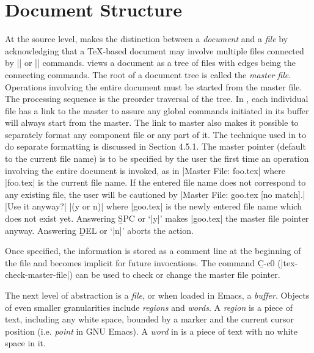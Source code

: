 \section{Document Structure}


\noindent 
At the source level, {\TM} makes the distinction between a {\it document\/} 
and a {\it file\/} by acknowledging that a {\TeX}-based document may involve 
multiple files connected by || or || commands.  {\TM} views a
document as a tree of files with edges being the connecting commands.
The root of a document tree is called the {\it master file\/}.
Operations involving the entire document must be started from the
master file.  The processing sequence is the preorder traversal of the tree.
In {\TM}, each individual file has a link to the master 
to assure any global commands initiated in its buffer will
always start from the master.  The link to master also makes it possible
to separately format any component file or any part of it.  The technique
used in {\TM} to do separate formatting is discussed in Section 4.5.1.
The master pointer (default to the current file name) is to be specified by
the user the first time an operation involving the entire document is invoked,
as in
\begindisplay
|Master File: foo.tex|\cr
\enddisplay
where |foo.tex| is the current file name.
If the entered file name does not correspond to any existing file,
the user will be cautioned by
\begindisplay
|Master File: goo.tex [no match].|  |Use it anyway?| |(y or n)|\cr
\enddisplay
where |goo.tex| is the newly entered file name which does not exist yet.
Answering {\b SPC} or `|y|' makes |goo.tex| the master file pointer anyway.
Answering {\b DEL} or `|n|' aborts the action.

Once specified, the information is stored as a comment line
at the beginning of the file and becomes implicit for future invocations.
The command {\b C-c{\s}0} (|tex-check-master-file|) can be used
to check or change the master file pointer.

The next level of abstraction is a {\it file\/}, or when loaded in Emacs, 
a {\it buffer\/}.
Objects of even smaller granularities include {\it regions\/} and 
{\it words\/}.  A {\it region\/} is a piece of text, including
any white space, bounded by a marker and the current cursor position
(i.e. {\it point\/} in GNU Emacs).  A {\it word\/} in {\TM} is a piece of text
with no white space in it.


